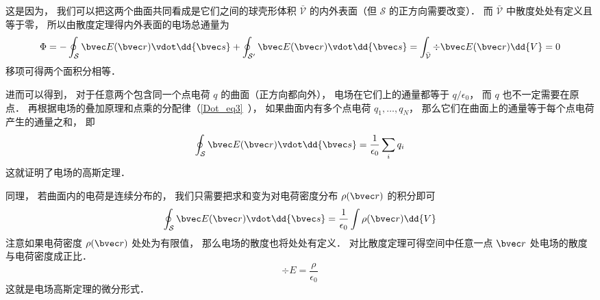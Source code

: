 这是因为， 我们可以把这两个曲面共同看成是它们之间的球壳形体积 $\bar{\mathcal V}$ 的内外表面（但 $\mathcal S$ 的正方向需要改变）． 而 $\bar{\mathcal V}$ 中散度处处有定义且等于零， 所以由散度定理得内外表面的电场总通量为
\begin{equation}
\Phi = -\oint_{\mathcal S} \bvec E(\bvec r) \vdot \dd{\bvec s} + \oint_{\mathcal S'} \bvec E(\bvec r)\vdot \dd{\bvec s} = \int_{\bar{\mathcal V}} \div \bvec E(\bvec r) \dd{V} = 0
\end{equation}
移项可得两个面积分相等．

进而可以得到， 对于任意两个包含同一个点电荷 $q$ 的曲面（正方向都向外）， 电场在它们上的通量都等于 $q/\epsilon_0$， 而 $q$ 也不一定需要在原点． 再根据电场的叠加原理和点乘的分配律（\autoref{Dot_eq3}~）， 如果曲面内有多个点电荷 $q_1, \dots, q_N$， 那么它们在曲面上的通量等于每个点电荷产生的通量之和， 即
\begin{equation}
\oint_{\mathcal S} \bvec E(\bvec r) \vdot \dd{\bvec s} = \frac{1}{\epsilon_0} \sum_i q_i
\end{equation}
这就证明了电场的高斯定理．

同理， 若曲面内的电荷是连续分布的， 我们只需要把求和变为对电荷密度分布 $\rho(\bvec r)$ 的积分即可
\begin{equation}
\oint_{\mathcal S} \bvec E(\bvec r) \vdot \dd{\bvec s} = \frac{1}{\epsilon_0} \int \rho(\bvec r) \dd{V}
\end{equation}
注意如果电荷密度 $\rho(\bvec r)$ 处处为有限值， 那么电场的散度也将处处有定义． 对比散度定理可得空间中任意一点 $\bvec r$ 处电场的散度与电荷密度成正比．
\begin{equation}
\div E = \frac{\rho}{\epsilon_0}
\end{equation}
这就是电场高斯定理的微分形式．
